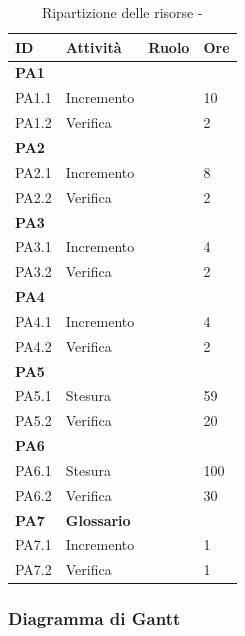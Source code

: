 \documentclass[12pt,a4paper]{article}
\begin{document}
\begin{table}[H]
	\begin{center}
		\begin{tabular}{p{} p{} p{} p{}}
			\toprule
			\textbf{ID}	& \textbf{Attività}	& \textbf{Ruolo} & \textbf{Ore}\\ \midrule
			\midrule
			\textbf{PA1} & \textbf{\AdR} & &  \\ \midrule
			PA1.1 & Incremento & \AN & 10 \\ \midrule
			PA1.2 & Verifica & \VR & 2 \\ \midrule
			\textbf{PA2} & \textbf{\NdP} &  &  \\ \midrule
			PA2.1 & Incremento & \AM & 8 \\ \midrule
			PA2.2 & Verifica & \VR & 2 \\ \midrule
			\textbf{PA3} & \textbf{\PdP} & &  \\ \midrule
			PA3.1 & Incremento & \RE & 4 \\ \midrule
			PA3.2 & Verifica & \VR & 2 \\ \midrule
			\textbf{PA4} & \textbf{\PdQ} & &  \\ \midrule
			PA4.1 & Incremento & \RE & 4 \\ \midrule
			PA4.2 & Verifica & \VR & 2 \\ \midrule
			\textbf{PA5} & \textbf{\ST} & &  \\ \midrule
			PA5.1 & Stesura & \PG & 59 \\ \midrule
			PA5.2 & Verifica & \VR & 20 \\ \midrule
			\textbf{PA6} & \textbf{\DP} & &  \\ \midrule
			PA6.1 & Stesura & \PG & 100 \\ \midrule
			PA6.2 & Verifica & \VR & 30 \\ \midrule
			\textbf{PA7} & \textbf{Glossario} & &  \\ \midrule
			PA7.1 & Incremento & \VR & 1 \\ \midrule
			PA7.2 & Verifica & \VR & 1 \\
			\bottomrule
		\end{tabular}
		\caption{Ripartizione delle risorse - \FPA}
	\end{center}
\end{table}

\subsubsection{Diagramma di Gantt}
\end{document}
